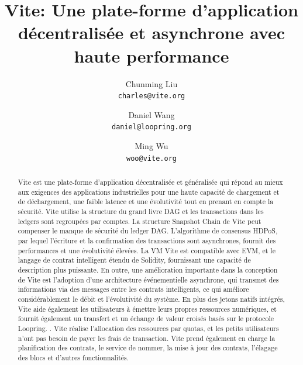 \documentclass[UTF8,nofonts]{article}
\title{\textbf{Vite: Une plate-forme d'application décentralisée et asynchrone avec haute performance}}
\author{
  Chunming Liu\\
  \texttt{charles@vite.org}\\
  \and
  Daniel Wang\\
  \texttt{daniel@loopring.org}\\
  \and
  Ming Wu\\
  \texttt{woo@vite.org}\\
 }
\date{}
\begin{document}
\maketitle

\begin{abstract}

Vite est une plate-forme d'application décentralisée et généralisée qui répond au mieux aux exigences des applications industrielles pour une haute capacité de chargement et de déchargement, une faible latence et une évolutivité tout en prenant en compte la sécurité. Vite utilise la structure du grand livre DAG et les transactions dans les ledgers sont regroupées par comptes. La structure Snapshot Chain de Vite peut compenser le manque de sécurité du ledger DAG. L'algorithme de consensus HDPoS, par lequel l'écriture et la confirmation des transactions sont asynchrones, fournit des performances et une évolutivité élevées. La VM Vite est compatible avec EVM, et le langage de contrat intelligent étendu de Solidity, fournissant une capacité de description plus puissante. En outre, une amélioration importante dans la conception de Vite est l'adoption d'une architecture événementielle asynchrone, qui transmet des informations via des messages entre les contrats intelligents, ce qui améliore considérablement le débit et l'évolutivité du système. En plus des jetons natifs intégrés, Vite aide également les utilisateurs à émettre leurs propres ressources numériques, et fournit également un transfert et un échange de valeur croisés basés sur le protocole Loopring. \cite{loopring}. Vite réalise l'allocation des ressources par quotas, et les petits utilisateurs n'ont pas besoin de payer les frais de transaction. Vite prend également en charge la planification des contrats, le service de nommer, la mise à jour des contrats, l'élagage des blocs et d'autres fonctionnalités.

\end{abstract}
\end{document}

